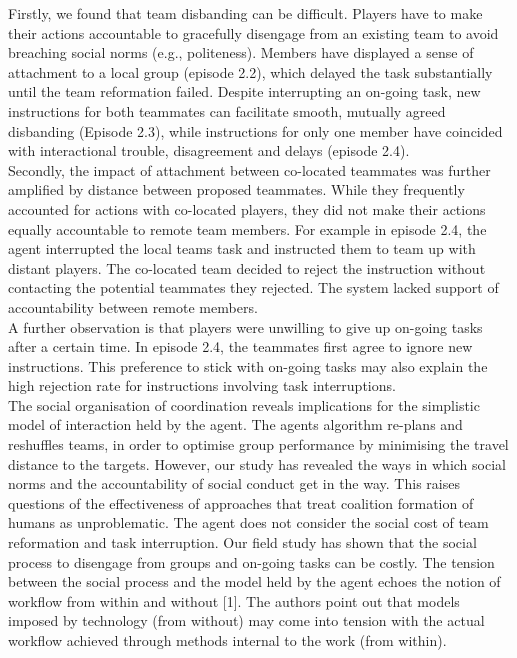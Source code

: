 Firstly, we found that team disbanding can be difficult. Players have to make their actions accountable to gracefully disengage from an existing team to avoid breaching social norms (e.g., politeness). Members have displayed a sense of attachment to a local group (episode 2.2), which delayed the task substantially until the team reformation failed. Despite interrupting an on-going task, new instructions for both teammates can facilitate smooth, mutually agreed disbanding (Episode 2.3), while instructions for only one member have coincided with interactional trouble, disagreement and delays (episode 2.4). \\

Secondly, the impact of attachment between co-located teammates was further amplified by distance between proposed teammates. While they frequently accounted for actions with co-located players, they did not make their actions equally accountable to remote team members. For example in episode 2.4, the agent interrupted the local teams task and instructed them to team up with distant players. The co-located team decided to reject the instruction without contacting the potential teammates they rejected. The system lacked support of accountability between remote members. \\

A further observation is that players were unwilling to give up on-going tasks after a certain time. In episode 2.4, the teammates first agree to ignore new instructions. This preference to stick with on-going tasks may also explain the high rejection rate for instructions involving task interruptions. \\

The social organisation of coordination reveals implications for the simplistic model of interaction held by the agent. The agents algorithm re-plans and reshuffles teams, in order to optimise group performance by minimising the travel distance to the targets. However, our study has revealed the ways in which social norms and the accountability of social conduct get in the way. This raises questions of the effectiveness of approaches that treat coalition formation of humans as unproblematic. The agent does not consider the social cost of team reformation and task interruption. Our field study has shown that the social process to disengage from groups and on-going tasks can be costly. The tension between the social process and the model held by the agent echoes the notion of workflow from within and without [1]. The authors point out that models imposed by technology (from without) may come into tension with the actual workflow achieved through methods internal to the work (from within). 

